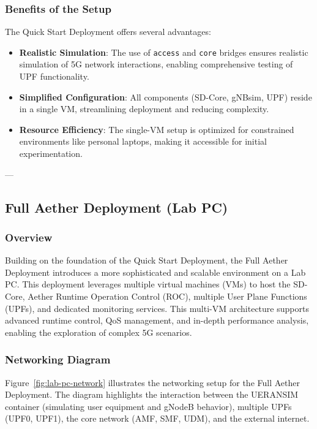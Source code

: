 \subsubsection{Benefits of the Setup}
\label{subsubsec:qs-benefits}

The Quick Start Deployment offers several advantages:
\begin{itemize}
    \item \textbf{Realistic Simulation}: The use of \texttt{access} and \texttt{core} bridges ensures realistic simulation of 5G network interactions, enabling comprehensive testing of UPF functionality.
    \item \textbf{Simplified Configuration}: All components (SD-Core, gNBsim, UPF) reside in a single VM, streamlining deployment and reducing complexity.
    \item \textbf{Resource Efficiency}: The single-VM setup is optimized for constrained environments like personal laptops, making it accessible for initial experimentation.
\end{itemize}

---

\subsection{Full Aether Deployment (Lab PC)}
\label{subsec:full-aether-deployment}

\subsubsection{Overview}
\label{subsubsec:labpc-overview}

Building on the foundation of the Quick Start Deployment, the Full Aether Deployment introduces a more sophisticated and scalable environment on a Lab PC. This deployment leverages multiple virtual machines (VMs) to host the SD-Core, Aether Runtime Operation Control (ROC), multiple User Plane Functions (UPFs), and dedicated monitoring services. This multi-VM architecture supports advanced runtime control, QoS management, and in-depth performance analysis, enabling the exploration of complex 5G scenarios.

\subsubsection{Networking Diagram}
\label{subsubsec:labpc-network-diagram}

Figure~\ref{fig:lab-pc-network} illustrates the networking setup for the Full Aether Deployment. The diagram highlights the interaction between the UERANSIM container (simulating user equipment and gNodeB behavior), multiple UPFs (UPF0, UPF1), the core network (AMF, SMF, UDM), and the external internet.

